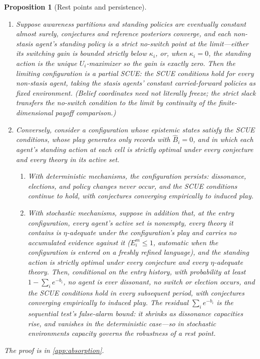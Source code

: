 \documentclass[11pt]{article}
\newtheorem{proposition}[assumption]{Proposition}
\theoremstyle{definition}
\begin{document}
\begin{proposition}[Rest points and persistence]
\label{prop:rest-points}
\leavevmode
\begin{enumerate}[label=(\roman*)]
  \item Suppose awareness partitions and standing policies are eventually constant almost surely, conjectures and reference posteriors converge, and each non-stasis agent's standing policy is a strict no-switch point at the limit---either its switching gain is bounded strictly below $\kappa_i$, or, when $\kappa_i=0$, the standing action is the unique $U_i$-maximizer so the gain is exactly zero.
  Then the limiting configuration is a \emph{partial SCUE}: the SCUE conditions hold for every non-stasis agent, taking the stasis agents' constant carried-forward policies as fixed environment.
  (Belief coordinates need not literally freeze; the strict slack transfers the no-switch condition to the limit by continuity of the finite-dimensional payoff comparison.)
  \item Conversely, consider a configuration whose epistemic states satisfy the SCUE conditions, whose play generates only records with $\widehat B_i=0$, and in which each agent's standing action at each cell is strictly optimal under every conjecture and every theory in its active set.
  \begin{enumerate}[label=(\alph*)]
    \item With deterministic mechanisms, the configuration persists: dissonance, elections, and policy changes never occur, and the SCUE conditions continue to hold, with conjectures converging empirically to induced play.
    \item With stochastic mechanisms, suppose in addition that, at the entry configuration, every agent's active set is nonempty, every theory it contains is $\eta$-adequate under the configuration's play and carries no accumulated evidence against it ($E_i^{m}\le1$, automatic when the configuration is entered on a freshly refined language), and the standing action is strictly optimal under every conjecture and every $\eta$-adequate theory.
    Then, conditional on the entry history, with probability at least $1-\sum_i e^{-b_i}$, no agent is ever dissonant, no switch or election occurs, and the SCUE conditions hold in every subsequent period, with conjectures converging empirically to induced play.
    The residual $\sum_i e^{-b_i}$ is the sequential test's false-alarm bound: it shrinks as dissonance capacities rise, and vanishes in the deterministic case---so in stochastic environments \emph{capacity governs the robustness of a rest point}.
  \end{enumerate}
\end{enumerate}
The proof is in \cref{app:absorption}.
\end{proposition}
\end{document}
